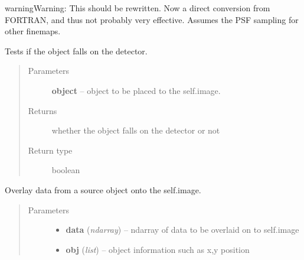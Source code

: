 \documentclass[a4paper,12pt,english]{sphinxmanual}
\begin{document}
\begin{fulllineitems}
\begin{fulllineitems}
\begin{notice}{warning}{Warning:}
This should be rewritten. Now a direct conversion from FORTRAN, and thus
not probably very effective. Assumes the PSF sampling for other finemaps.
\end{notice}

\end{fulllineitems}


\begin{fulllineitems}
\label{simulator:simulator.simulator.VISsimulator.objectOnDetector}
Tests if the object falls on the detector.
\begin{quote}\begin{description}
\item[{Parameters}] \leavevmode
\textbf{object} -- object to be placed to the self.image.

\item[{Returns}] \leavevmode
whether the object falls on the detector or not

\item[{Return type}] \leavevmode
boolean

\end{description}\end{quote}

\end{fulllineitems}


\begin{fulllineitems}
\label{simulator:simulator.simulator.VISsimulator.overlayToCCD}
Overlay data from a source object onto the self.image.
\begin{quote}\begin{description}
\item[{Parameters}] \leavevmode\begin{itemize}
\item {} 
\textbf{data} (\emph{ndarray}) -- ndarray of data to be overlaid on to self.image

\item {} 
\textbf{obj} (\emph{list}) -- object information such as x,y position

\end{itemize}


\end{description}
\end{quote}
\end{fulllineitems}
\end{fulllineitems}
\end{document}
